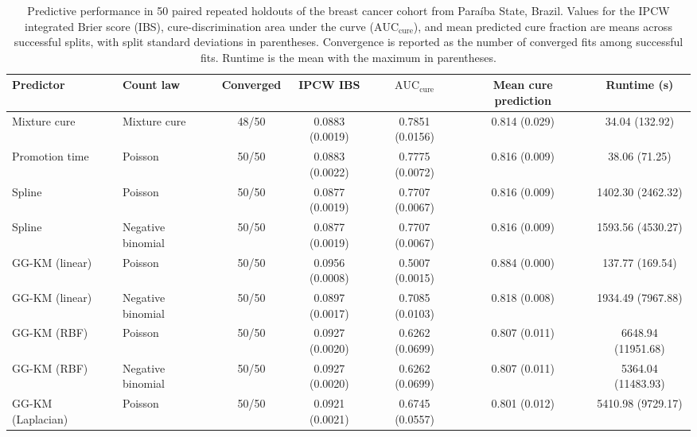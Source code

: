 \begin{table}[tbp]
\caption{Predictive performance in 50 paired repeated holdouts of the breast cancer cohort
from Paraíba State, Brazil. Values for the IPCW integrated Brier score (IBS),
cure-discrimination area under the curve ($\mathrm{AUC}_{\mathrm{cure}}$), and mean
predicted cure fraction are means across successful splits, with split standard deviations
in parentheses. Convergence is reported as the number of converged fits among successful
fits. Runtime is the mean with the maximum in parentheses.
}
\label{tab:breast-cancer-performance}
\centering
\begin{tabular}{llccccc}
\hline
Predictor & Count law & Converged & IPCW IBS &
$\mathrm{AUC}_{\mathrm{cure}}$ & Mean cure prediction & Runtime (s) \\
\hline

Mixture cure
& Mixture cure
& 48/50
& 0.0883 (0.0019)
& 0.7851 (0.0156)
& 0.814 (0.029)
& 34.04 (132.92) \\

Promotion time
& Poisson
& 50/50
& 0.0883 (0.0022)
& 0.7775 (0.0072)
& 0.816 (0.009)
& 38.06 (71.25) \\

\hline

Spline
& Poisson
& 50/50
& 0.0877 (0.0019)
& 0.7707 (0.0067)
& 0.816 (0.009)
& 1402.30 (2462.32) \\

Spline
& Negative binomial
& 50/50
& 0.0877 (0.0019)
& 0.7707 (0.0067)
& 0.816 (0.009)
& 1593.56 (4530.27) \\

\hline

GG-KM (linear)
& Poisson
& 50/50
& 0.0956 (0.0008)
& 0.5007 (0.0015)
& 0.884 (0.000)
& 137.77 (169.54) \\

GG-KM (linear)
& Negative binomial
& 50/50
& 0.0897 (0.0017)
& 0.7085 (0.0103)
& 0.818 (0.008)
& 1934.49 (7967.88) \\

GG-KM (RBF)
& Poisson
& 50/50
& 0.0927 (0.0020)
& 0.6262 (0.0699)
& 0.807 (0.011)
& 6648.94 (11951.68) \\

GG-KM (RBF)
& Negative binomial
& 50/50
& 0.0927 (0.0020)
& 0.6262 (0.0699)
& 0.807 (0.011)
& 5364.04 (11483.93) \\

GG-KM (Laplacian)
& Poisson
& 50/50
& 0.0921 (0.0021)
& 0.6745 (0.0557)
& 0.801 (0.012)
& 5410.98 (9729.17) \\


\end{tabular}
\end{table}
